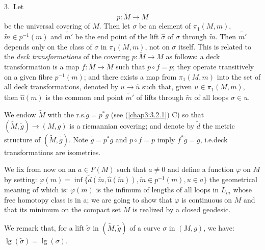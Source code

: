 \setcounter{subsection}{4}
\subsection{}\label{chap7:7.6.5}
3.~Let
$$
p:\widetilde{M}\to M
$$
be the universal covering of $M$. Then let $\sigma$ be an element of
$\pi_{1}(M,m)$, $\widetilde{m}\in p^{-1}(m)$ and $\widetilde{m'}$ be
the end point of the lift $\widehat{\sigma}$ of $\sigma$ through
$\widetilde{m}$. Then $\widetilde{m'}$ depends only on the class of
$\sigma$ in $\pi_{1}(M,m)$, not on $\sigma$ itself. This is related to
the {\em deck transformations} of the covering $p:\widetilde{M}\to M$
as follows: a deck transformation is a map $f:\widetilde{M}\to
\widetilde{M}$ such that $p\circ f=p$; they operate transitively on a
given fibre $p^{-1}(m)$; and there exists a map from $\pi_{1}(M,m)$
into the set of all deck transformations, denoted by $u\to
\widehat{u}$ such that, given $u\in \pi_{1}(M,m)$, then
$\widehat{u}(m)$ is the common end point $\widetilde{m'}$ of lifts
through $\widetilde{m}$ of all loops $\sigma \in u$.

We endow $\widetilde{M}$ with the r.s.\@ $\widetilde{g}=p^{\ast}g$
(see (\ref{chap3:3.2.1}) C) so that $(\widetilde{M},\widetilde{g})\to (M,g)$
is a riemannian covering; and denote by $\widetilde{d}$ the metric
structure of $(\widetilde{M},\widetilde{g})$. Note
$\widetilde{g}=p^{\ast}g$ and $p\circ f=p$ imply
$f^{\ast}\widetilde{g}=\widetilde{g}$, i.e.\@ deck transformations are
isometries.

We fix from now on an $a\in\overline{F}(M)$ such that $a\neq 0$ and
define a function $\varphi$ on $M$ by setting:
$\varphi(m)=\inf\{\widetilde{d}(\widetilde{m},\widehat{u}(\widetilde{m})),
\widetilde{m}\in p^{-1}(m),u\in a\}$ \pageoriginale the geometrical
meaning of which is: $\varphi(m)$ is the infimum of lengths of all
loops in $L_{m}$ whose free homotopy class is in a; we are going to
show that $\varphi$ is continuous on $M$ and that its minimum on the
compact set $M$ is realized by a closed geodesic.

We remark that, for a lift $\widetilde{\sigma}$ in
$(\widetilde{M},\widetilde{g})$ of a curve $\sigma$ in $(M,g)$, we
have: $\lg(\widetilde{\sigma})=\lg(\sigma)$. 

\setcounter{subsection}{5}

\subsection{}\label{chap7:7.6.6}

